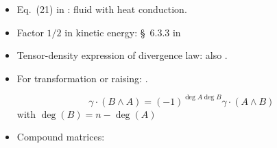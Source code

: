 \documentclass[\ifafour a4paper,12pt,\else a5paper,10pt,\fi%
onecolumn,oneside,article,%
british%
]{memoir}
\theoremstyle{remark}
\theoremstyle{innote}
\renewcommand*{\finalnamedelim}{\addspace\amp\space}
\newcommand*{\amp}{\&}
\renewcommand*{\bm}[1]{\textpdfrender{TextRenderingMode=2,LineWidth=0.1pt}{\boldsymbol{#1}}}
\renewcommand*{\|}[1][]{\nonscript\:#1\vert\nonscript\:\mathopen{}}
\newcommand*{\sect}{\S}%
\newcommand*{\eqn}{eq.}%
\begin{document}
\begin{itemize}
\item Eq.~(21) in \cites{maugin1974b}: fluid with heat conduction.
\item Factor $1/2$ in kinetic energy: \sect~6.3.3 in \cites{gourgoulhon2007_r2012}

\item Tensor-density expression of divergence law:  \cites{castrillonlopezetal2008} also  \cites{kopeikinetal2011,soffeletal2019}.

\item For transformation or raising:  \cites[\sect~I.4 \eqn~(33)]{gantmacher1959_r2000}.

\begin{equation}
  \gamma\cdot (B\land A) = (-1)^{\deg{A}\deg{B}} \gamma\cdot(A \land B)
\end{equation}
with $\deg(B) = n-\deg(A)$
\cites[prop.~4.1]{barnabeietal1985}


\item Compound matrices:  \cites[\sect~IV.A.1 p.~199, Problem~1 p.~270]{choquetbruhatetal1977_r1996}
\end{itemize}

\renewcommand*{\finalnamedelim}{\addcomma\space}

\printbibliography[prenote=prenote%
]
\end{document}

